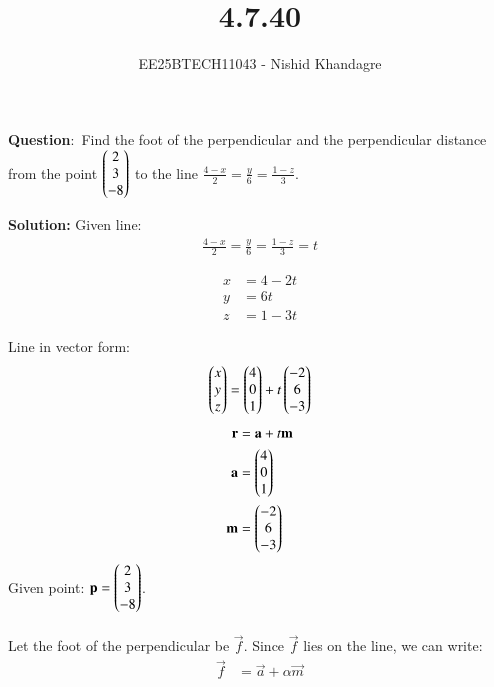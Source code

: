 \documentclass[journal]{IEEEtran}
\title{4.7.40}
\author{EE25BTECH11043 - Nishid Khandagre} %
\begin{document}
\maketitle

\renewcommand{\thefigure}{\theenumi}
\renewcommand{\thetable}{\theenumi}


\textbf{Question}:\
Find the foot of the perpendicular and the perpendicular distance from the point $\begin{pmatrix}2 \\ 3 \\ -8\end{pmatrix}$ to the line $\frac{4-x}{2}=\frac{y}{6}=\frac{1-z}{3}$.

\textbf{Solution: }
Given line: 
\begin{align}
\frac{4-x}{2}=\frac{y}{6}=\frac{1-z}{3}=t
\end{align}

\begin{align}
x &= 4-2t \\
y &= 6t \\
z &= 1-3t
\end{align}

Line in vector form:
\begin{align}
\begin{pmatrix}x \\ y \\ z\end{pmatrix} = \begin{pmatrix}4 \\ 0 \\ 1\end{pmatrix} + t \begin{pmatrix}-2 \\ 6 \\ -3\end{pmatrix}
\end{align}
\begin{align}
\mathbf{r} &= \mathbf{a} + t \mathbf{m} \\
\mathbf{a} &= \begin{pmatrix}4 \\ 0 \\ 1\end{pmatrix} \\
\mathbf{m} &= \begin{pmatrix}-2 \\ 6 \\ -3\end{pmatrix}
\end{align}
Given point: $\mathbf{p} = \begin{pmatrix}2 \\ 3 \\ -8\end{pmatrix}$.\\ \\


Let the foot of the perpendicular be $\vec{f}$. Since $\vec{f}$ lies on the line, we can write:
\begin{align}
\vec{f} &= \vec{a} + \alpha\vec{m}
\end{align}
\end{document}
